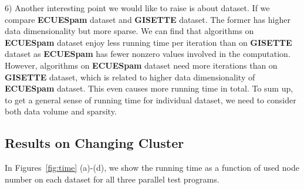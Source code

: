 \documentclass[10pt, conference, compsocconf]{IEEEtran}
\begin{document}
6) Another interesting point we would like to raise is about dataset. If we compare \textbf{ECUESpam} dataset and \textbf{GISETTE} dataset.
          The former has higher data dimensionality but more sparse.
          We can find that algorithms on \textbf{ECUESpam} dataset enjoy less running time per iteration than on \textbf{GISETTE} dataset as \textbf{ECUESpam} has fewer nonzero values involved in the computation.
          However, algorithms on \textbf{ECUESpam} dataset need more iterations than on \textbf{GISETTE} dataset, which is related to higher data dimensionality of \textbf{ECUESpam} dataset. This even causes more running time in total.
          To sum up, to get a general sense of running time for individual dataset, we need to consider both data volume and sparsity.

\subsection{Results on Changing Cluster}
In Figures~\ref{fig:time} (a)-(d), we show the running time as a function of used node number on each dataset for all three parallel test programs.
%
\end{document}
